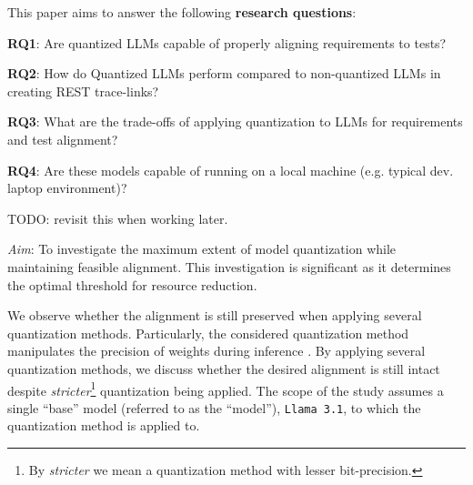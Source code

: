 \documentclass[conference]{IEEEtran}
\begin{document}



This paper aims to answer the following \textbf{research questions}:

\begin{tcolorbox}
\noindent
\textbf{RQ1}: Are quantized LLMs capable of properly aligning requirements to tests?

\noindent
\textbf{RQ2}: How do Quantized LLMs perform compared to non-quantized LLMs in creating REST trace-links?

\noindent
\textbf{RQ3}: What are the trade-offs of applying quantization to LLMs for requirements and test alignment?

\noindent
\textbf{RQ4}: Are these models capable of running on a local machine (e.g. typical dev. laptop environment)?

TODO: revisit this when working later.

\setlength\parindent{6pt}
\textit{Aim}: To investigate the maximum extent of model quantization while
maintaining feasible alignment. This investigation is significant as it
determines the optimal threshold for resource reduction.
\end{tcolorbox}

We observe whether the alignment is still preserved when applying several
quantization methods. Particularly, the considered quantization method
manipulates the precision of weights during inference
\cite{egashiraExploitingLLMQuantization2024}. By applying several quantization
methods, we discuss whether the desired alignment is still intact despite
\textit{stricter}\footnote{By \textit{stricter} we mean a quantization method
with lesser bit-precision.} quantization being applied.  The scope of the study
assumes a single ``base'' model (referred to as the ``model''),
\verb|Llama 3.1|, to which the quantization method is applied to.
\end{document}
